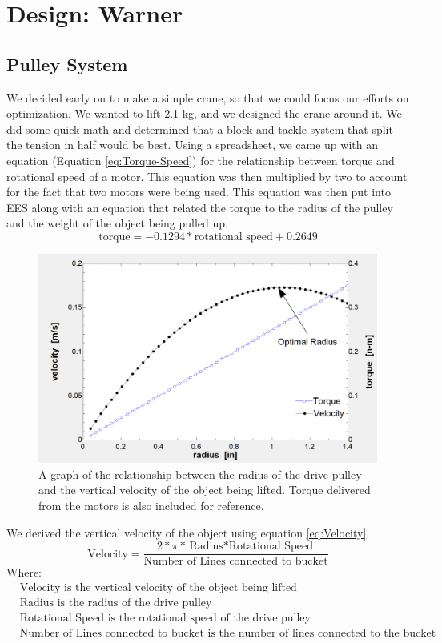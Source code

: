 \documentclass[letterpaper, 12pt]{article}
\begin{document}
\section{Design: Warner}

\subsection{Pulley System}
We decided early on to make a simple crane, so that we could focus our efforts on optimization.
We wanted to lift 2.1 kg, and we designed the crane around it. 
We did some quick math and determined that a block and tackle system that split the tension in half would be best. 
Using a spreadsheet, we came up with an equation (Equation \ref{eq:Torque-Speed}) for the relationship between torque and rotational speed of a motor. 
This equation was then multiplied by two to account for the fact that two motors were being used. 
This equation was then put into EES along with an equation that related the torque to the radius of the pulley and the weight of the object being pulled up.
\begin{equation}
    \text{torque}=-0.1294 * \text{rotational speed}+0.2649 \label{eq:Torque-Speed} 
\end{equation}
\begin{figure}[H]
    \centering
    \includegraphics[width =.45\linewidth]{Torque_Speed.png}
    \caption{A graph of the relationship between the radius of the drive pulley and the vertical velocity of the object being lifted. Torque delivered from the motors is also included for reference.}
    \label{fig:Torque_Speed}
\end{figure}

We derived the vertical velocity of the object using equation \ref{eq:Velocity}.
\begin{equation}
        \text{Velocity}=\frac{2*\pi*{\text{Radius}*\text{Rotational Speed}}}{\text{Number of Lines connected to bucket}} \label{eq:Velocity}
\end{equation}
Where:
\begin{equation}
    \begin{split}
       & \text{Velocity} \text{ is the vertical velocity of the object being lifted} \\
        &\text{Radius}  \text{ is the radius of the drive pulley} \\
        &\text{Rotational Speed}  \text{ is the rotational speed of the drive pulley} \\
        &\text{Number of Lines connected to bucket}  \text{ is the number of lines connected to the bucket}
    \end{split}
\end{equation}
\end{document}
